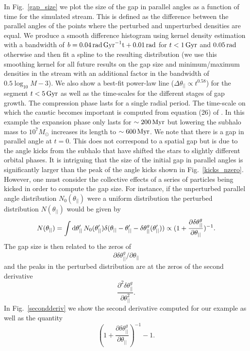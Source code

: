 \documentclass[useAMS,usenatbib,fleqn,a4paper]{mn2e}
\def\d{{\rm d}}
\def\rad{\,\rm rad}
\def\Gyr{\,{\rm Gyr}}
\def\Myr{\,{\rm Myr}}
\begin{document}
In Fig.~\ref{gap_size} we plot the size of the gap in parallel angles as a function of time for the simulated stream. This is defined as the difference between the parallel angles of the points where the perturbed and unperturbed densities are equal. We produce a smooth difference histogram using kernel density estimation with a bandwidth of $b = 0.04\rad\Gyr^{-1}t+0.01\rad$ for $t<1\Gyr$ and $0.05\rad$ otherwise and then fit a spline to the resulting distribution (we use this smoothing kernel for all future results on the gap size and minimum/maximum densities in the stream with an additional factor in the bandwidth of $0.5\log_{10}M-3$). We also show a best-fit power-law line ($\Delta\theta_{||}\propto t^{0.58}$) for the segment $t<5\Gyr$ as well as the time-scales for the different stages of gap growth. The compression phase lasts for a single radial period. The time-scale on which the caustic becomes important is computed from equation (26) of \cite{ErkalBelokurov2015}. In this example the expansion phase only lasts for $\sim200\Myr$ but lowering the subhalo mass to $10^7M_\odot$ increases its length to $\sim600\Myr$. We note that there is a gap in parallel angle at $t=0$. This does not correspond to a spatial gap but is due to the angle kicks from the subhalo that have shifted the stars to slightly different orbital phases. It is intriguing that the size of the initial gap in parallel angles is significantly larger than the peak of the angle kicks shown in Fig.~\ref{kicks_nzero}. However, one must consider the collective effects of a series of particles being kicked in order to compute the gap size. For instance, if the unperturbed parallel angle distribution $N_0(\theta_{||})$ were a uniform distribution the perturbed distribution $N(\theta_{||})$ would be given by
\begin{equation}
N(\theta_{||})=\int \d\theta'_{||}\,N_0(\theta'_{||})\delta(\theta_{||}-\theta'_{||}-\delta\theta^g_{||}(\theta'_{||}))\propto(1+\frac{\partial\delta\theta^g_{||}}{\partial\theta_{||}})^{-1}.
\label{UniformAssump}
\end{equation}
The gap size is then related to the zeros of
\[
\partial\delta\theta^g_{||}/\partial\theta_{||}
\]
and the peaks in the perturbed distribution are at the zeros of the second derivative
\[
\frac{\partial^2\delta\theta^g_{||}}{\partial\theta^{2}_{||}}.
\]
In Fig.~\ref{secondderiv} we show the second derivative computed for our example as well as the quantity
\begin{equation}
(1+\frac{\partial\delta\theta^g_{||}}{\partial\theta_{||}})^{-1}-1.
\label{deriv}
\end{equation}
\end{document}
